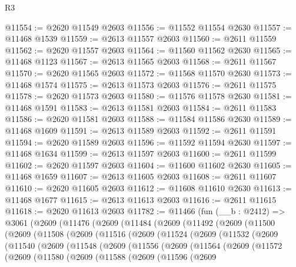 \begin{lexlean}{R3}
\begin{coremodule}
@11554 := @2620 @11549 @2603
@11556 := @11552 @11554 @2630
@11557 := @11468 @1539
@11559 := @2613 @11557 @2603
@11560 := @2611 @11559
@11562 := @2620 @11557 @2603
@11564 := @11560 @11562 @2630
@11565 := @11468 @1123
@11567 := @2613 @11565 @2603
@11568 := @2611 @11567
@11570 := @2620 @11565 @2603
@11572 := @11568 @11570 @2630
@11573 := @11468 @1574
@11575 := @2613 @11573 @2603
@11576 := @2611 @11575
@11578 := @2620 @11573 @2603
@11580 := @11576 @11578 @2630
@11581 := @11468 @1591
@11583 := @2613 @11581 @2603
@11584 := @2611 @11583
@11586 := @2620 @11581 @2603
@11588 := @11584 @11586 @2630
@11589 := @11468 @1609
@11591 := @2613 @11589 @2603
@11592 := @2611 @11591
@11594 := @2620 @11589 @2603
@11596 := @11592 @11594 @2630
@11597 := @11468 @1634
@11599 := @2613 @11597 @2603
@11600 := @2611 @11599
@11602 := @2620 @11597 @2603
@11604 := @11600 @11602 @2630
@11605 := @11468 @1659
@11607 := @2613 @11605 @2603
@11608 := @2611 @11607
@11610 := @2620 @11605 @2603
@11612 := @11608 @11610 @2630
@11613 := @11468 @1677
@11615 := @2613 @11613 @2603
@11616 := @2611 @11615
@11618 := @2620 @11613 @2603
@11782 := @11466
    (fun (__b : @2412) =>
    @3061
      (@2609
        (@11476
          (@2609
            (@11484
              (@2609
                (@11492
                  (@2609
                    (@11500
                      (@2609
                        (@11508
                          (@2609
                            (@11516
                              (@2609
                                (@11524
                                  (@2609
                                    (@11532
                                      (@2609
                                        (@11540
                                          (@2609
                                            (@11548
                                              (@2609
                                                (@11556
                                                  (@2609
                                                    (@11564
                                                      (@2609
                                                        (@11572
                                                          (@2609
                                                            (@11580
                                                              (@2609
                                                                (@11588
                                                                  (@2609
                                                                    (@11596
                                                                      (@2609

\end{coremodule}
\end{lexlean}
